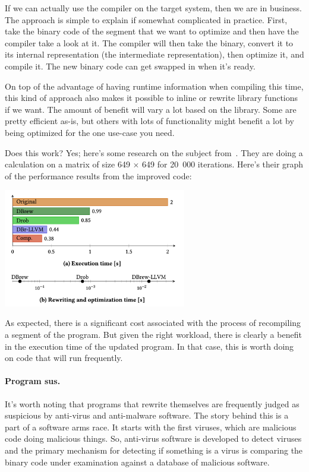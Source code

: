 If we can actually use the compiler on the target system, then we are in business. The approach is simple to explain if somewhat complicated in practice. First, take the binary code of the segment that we want to optimize and then have the compiler take a look at it. The compiler will then take the binary, convert it to its internal representation (the intermediate representation), then optimize it, and compile it. The new binary code can get swapped in when it's ready.

On top of the advantage of having runtime information when compiling this time, this kind of approach also makes it possible to inline or rewrite library functions if we want. The amount of benefit will vary a lot based on the library. Some are pretty efficient as-is, but others with lots of functionality might benefit a lot by being optimized for the one use-case you need.

Does this work? Yes; here's some research on the subject from~\cite{binaryrewriting}. They are doing a calculation on a matrix of size 649 $\times$ 649 for 20~000 iterations. Here's their graph of the performance results from the improved code:

\begin{center}
	\includegraphics[width=0.6\textwidth]{images/rewriting.png}
\end{center}

As expected, there is a significant cost associated with the process of recompiling a segment of the program. But given the right workload, there is clearly a benefit in the execution time of the updated program. In that case, this is worth doing on code that will run frequently.

\paragraph{Program sus.}
It's worth noting that programs that rewrite themselves are frequently judged as suspicious by anti-virus and anti-malware software. The story behind this is a part of a software arms race. It starts with the first viruses, which are malicious code doing malicious things. So, anti-virus software is developed to detect viruses and the primary mechanism for detecting if something is a virus is comparing the binary code under examination against a database of malicious software.

